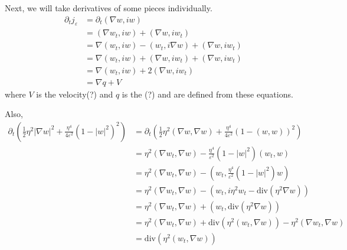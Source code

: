 \documentclass[a4paper]{article}
\renewcommand{\div}{\mathrm{div}}
\begin{document}
Next, we will take derivatives of some pieces individually.
\begin{align} \label{eqn:current_deriv}
  \partial_t j_\varepsilon &= \partial_t (\nabla w, iw) \nonumber \\
  &= ( \nabla w_t, iw ) + ( \nabla w, i w_t) \nonumber \\
  &= \nabla( w_t, iw) - (w_t, i \nabla w) + ( \nabla w, i w_t) \nonumber \\
  &= \nabla( w_t, iw) + (\nabla w, i w_t) + ( \nabla w, i w_t) \nonumber \\
  &= \nabla( w_t, iw) + 2(\nabla w, i w_t) \\
  &= \nabla q + V \nonumber
\end{align}
where $V$ is the velocity(?) and $q$ is the (?) and are defined from these equations.

Also,
\begin{align} \label{eqn:?}
  \partial_t \left( \frac{1}{2} \eta^2 | \nabla w |^2 + \frac{\eta^4}{4 \varepsilon^2} (1-|w|^2)^2 \right) &= \partial_t \left( \frac{1}{2} \eta^2
  (\nabla w, \nabla w) + \frac{\eta^4}{4 \varepsilon^2} ( 1 - (w,w))^2 \right) \nonumber \\
  &= \eta^2 (\nabla w_t, \nabla w) - \frac{\eta^4}{ \varepsilon^2} (1 - |w|^2) (w_t,w) \nonumber \\
  &= \eta^2 (\nabla w_t, \nabla w) - \left( w_t, \frac{\eta^4}{\varepsilon^2} (1 - |w|^2)w \right) \nonumber \\
  &= \eta^2 (\nabla w_t, \nabla w) - (w_t, i \eta^2 w_t - \div(\eta^2 \nabla w) ) \nonumber \\
  &= \eta^2 (\nabla w_t, \nabla w) + (w_t, \div(\eta^2 \nabla w)) \nonumber \\
  &= \eta^2 (\nabla w_t, \nabla w) + \div (\eta^2 (w_t, \nabla w)) - \eta^2 (\nabla w_t, \nabla w) \nonumber \\
  &= \div( \eta^2 ( w_t, \nabla w) )
\end{align}
\end{document}
